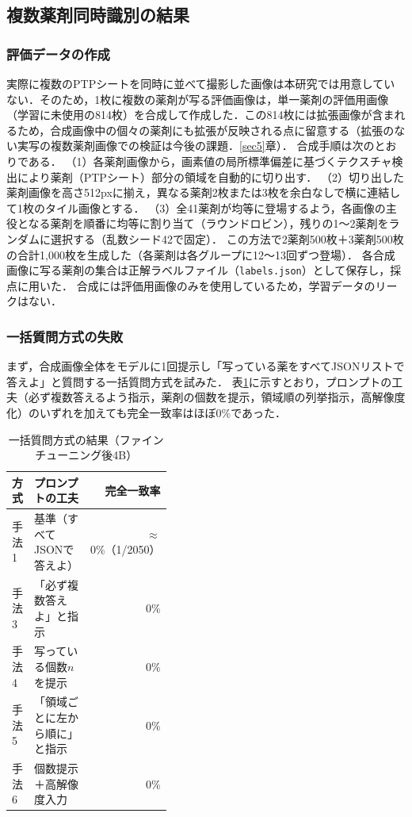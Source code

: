 \documentclass[dvipdfmx]{jsarticle}
\begin{document}
\subsection{複数薬剤同時識別の結果}\label{sec:multi_result}

\subsubsection{評価データの作成}

実際に複数のPTPシートを同時に並べて撮影した画像は本研究では用意していない．そのため，1枚に複数の薬剤が写る評価画像は，単一薬剤の評価用画像（学習に未使用の814枚）を合成して作成した．この814枚には拡張画像が含まれるため，合成画像中の個々の薬剤にも拡張が反映される点に留意する（拡張のない実写の複数薬剤画像での検証は今後の課題．\ref{sec5}章）．
合成手順は次のとおりである．
（1）各薬剤画像から，画素値の局所標準偏差に基づくテクスチャ検出により薬剤（PTPシート）部分の領域を自動的に切り出す．
（2）切り出した薬剤画像を高さ512pxに揃え，異なる薬剤2枚または3枚を余白なしで横に連結して1枚のタイル画像とする．
（3）全41薬剤が均等に登場するよう，各画像の主役となる薬剤を順番に均等に割り当て（ラウンドロビン），残りの1〜2薬剤をランダムに選択する（乱数シード42で固定）．
この方法で2薬剤500枚＋3薬剤500枚の合計1,000枚を生成した（各薬剤は各グループに12〜13回ずつ登場）．
各合成画像に写る薬剤の集合は正解ラベルファイル（\texttt{labels.json}）として保存し，採点に用いた．
合成には評価用画像のみを使用しているため，学習データのリークはない．

\subsubsection{一括質問方式の失敗}

まず，合成画像全体をモデルに1回提示し「写っている薬をすべてJSONリストで答えよ」と質問する一括質問方式を試みた．
表\ref{tab:multi_naive}に示すとおり，プロンプトの工夫（必ず複数答えるよう指示，薬剤の個数を提示，領域順の列挙指示，高解像度化）のいずれを加えても完全一致率はほぼ0\%であった．

\begin{table}[htbp]
\centering
\caption{一括質問方式の結果（ファインチューニング後4B）}
\label{tab:multi_naive}
\small
\begin{tabular}{lp{0.4\linewidth}r}
\hline
方式 & プロンプトの工夫 & 完全一致率 \\
\hline
手法1 & 基準（すべてJSONで答えよ） & $\approx$0\%（1/2050） \\
手法3 & 「必ず複数答えよ」と指示 & 0\% \\
手法4 & 写っている個数$n$を提示 & 0\% \\
手法5 & 「領域ごとに左から順に」と指示 & 0\% \\
手法6 & 個数提示＋高解像度入力 & 0\% \\
\hline
\end{tabular}
\end{table}
\end{document}
